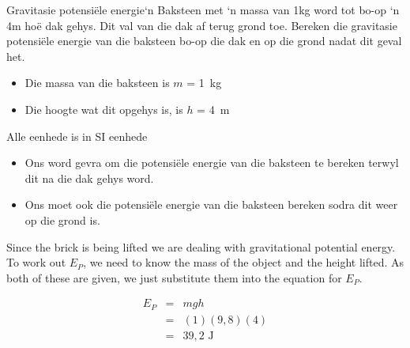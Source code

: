       \noindent
\begin{wex}{Gravitasie potensi\"{e}le energie}{‘n Baksteen met ‘n massa van 1kg word tot bo-op ‘n 4m ho\"{e} dak gehys. Dit val van die dak af terug grond toe. Bereken die gravitasie potensi\"{e}le energie van die baksteen bo-op die dak en op die grond nadat dit geval het.}
{
\begin{itemize}
\item{Die massa van die baksteen is $m$ = 1~kg}
\item{Die hoogte wat dit opgehys is, is $h$ = 4~m}
\end{itemize}
Alle eenhede is in SI eenhede

\begin{itemize}
\item Ons word gevra om die potensi\"{e}le energie van die baksteen te bereken terwyl dit na die dak gehys word.
\item Ons moet ook die potensi\"{e}le energie van die baksteen bereken sodra dit weer op die grond is.
\end{itemize}

Since the brick is being lifted we are dealing with gravitational potential energy. To work out $E_{P}$, we need to know the mass of the object and the height lifted. As both of these are given, we just substitute them into the equation for $E_{P}$.

\begin{eqnarray*}
E_{P} & = & mgh \\
&=& (1)(9,8)(4) \\
&=& 39,2 \text{ J}
\end{eqnarray*}}
\end{wex}

